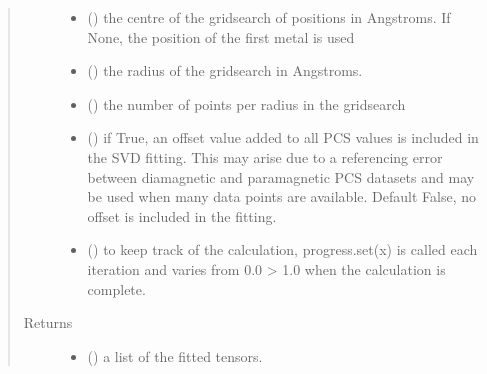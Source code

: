 \documentclass[a4paper,10pt,english,openany,oneside]{sphinxmanual}
\begin{document}
\begin{fulllineitems}
\begin{quote}
\begin{description}
\begin{itemize}
\item {} 
\sphinxAtStartPar
{} (\sphinxstyleliteralemphasis{\sphinxupquote{, }}) \textendash{} the centre of the gridsearch of positions in Angstroms.
If None, the position of the first metal is used

\item {} 
\sphinxAtStartPar
{} (\sphinxstyleliteralemphasis{\sphinxupquote{, }}) \textendash{} the radius of the gridsearch in Angstroms.

\item {} 
\sphinxAtStartPar
{} (\sphinxstyleliteralemphasis{\sphinxupquote{, }}) \textendash{} the number of points per radius in the gridsearch

\item {} 
\sphinxAtStartPar
{} (\sphinxstyleliteralemphasis{\sphinxupquote{, }}) \textendash{} if True, an offset value added to all PCS values is included in
the SVD fitting. This may arise due to a referencing error between
diamagnetic and paramagnetic PCS datasets and may be used when
many data points are available.
Default False, no offset is included in the fitting.

\item {} 
\sphinxAtStartPar
{} (\sphinxstyleliteralemphasis{\sphinxupquote{, }}) \textendash{} to keep track of the calculation, progress.set(x) is called each
iteration and varies from 0.0 \sphinxhyphen{}\textgreater{} 1.0 when the calculation is complete.

\end{itemize}

\item[{Returns}] \leavevmode
\sphinxAtStartPar
\begin{itemize}
\item {} 
\sphinxAtStartPar
{} () \textendash{} a list of the fitted tensors.


\end{itemize}
\end{description}
\end{quote}
\end{fulllineitems}
\end{document}
